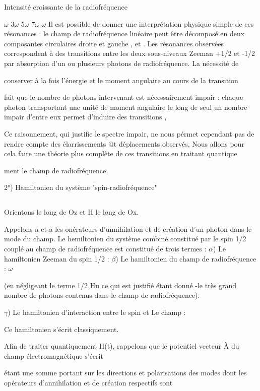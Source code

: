 Intensité croissante
de la radiofréquence

 $\omega$ 3$\omega$ 5$\omega$ 7$\omega$ $\omega$
Il est possible de donner une interprétation physique simple de ces
résonances : le champ de radiofréquence linéaire peut être décomposé en deux
composantes circulaires droite et gauche , et . Les résonances observées correspondent
à des transitions entre les deux sous-niveaux Zeeman +1/2 et -1/2
par absorption d'un ou plusieurs photons de radiofréquence. La nécessité de

conserver à la fois l'énergie et le moment angulaire au cours de la transition

fait que le nombre de photons intervenant est nécessairement impair : chaque
photon transportant une unité de moment angulaire le long de seul un
nombre impair d'entre eux permet d'induire des transitions ,

Ce raisonnement, qui justifie le spectre impair, ne nous pérmet cependant pas
de rendre compte des élarrissements @t déplacements observés, Nous allons pour
cela faire une théorie plus complète de ces transitions en traitant quantique

ment le champ de radiofréquence,

2°) Hamiltonien du système "spin-radiofréquence"

\subsection{}%

Orientons  le long de Oz et H le long de Ox.

Appelons a et a les onérateurs d'unnihilation et de création d'un
photon dans le mode du champ. Le hemiltonien du système combiné constitué par
le spin 1/2 couplé au champ de radiofréquence est constitué de trois termes :
$\alpha$) Le hamiltonien Zeeman du spin 1/2 :
$\beta$) Le hamiltonien du champ de radiofréquence : $\omega$

(en négligeant le terme 1/2 Hu ce qui est justifié étant donné -le très grand
nombre de photons contenus dans le champ de radiofréquence).

$\gamma$) Le hamiltonien d'interaction entre le spin et Le champ : 

Ce hamiltonien s'écrit classiquement.


Afin de traiter quantiquement H(t), rappelons que le potentiel
vecteur À du champ électromagnétique s'écrit

étant une somme portant sur les directions et polarisations des modes
dont les opérateurs d'annihilation et de création respectifs sont

